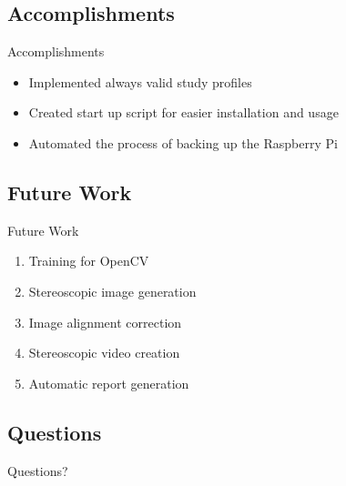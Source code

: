 \documentclass[17pt, aspectratio=169]{beamer}
\begin{document}
\subsection{Accomplishments}
\begin{frame}{Accomplishments}
	\begin{itemize}
		\item Implemented always valid study profiles
		\item Created start up script for easier installation and usage
		\item Automated the process of backing up the Raspberry Pi
	\end{itemize}
\end{frame}
\subsection*{Future Work}
\begin{frame}{Future Work}
	\begin{enumerate}
		\item Training for OpenCV
		\item Stereoscopic image generation
		\item Image alignment correction
		\item Stereoscopic video creation
		\item Automatic report generation
	\end{enumerate}
\end{frame}
\subsection*{Questions}
\begin{frame}
	\begin{center}
		\begin{huge}
			Questions?
		\end{huge}
	\end{center}
\end{frame}
\end{document}

